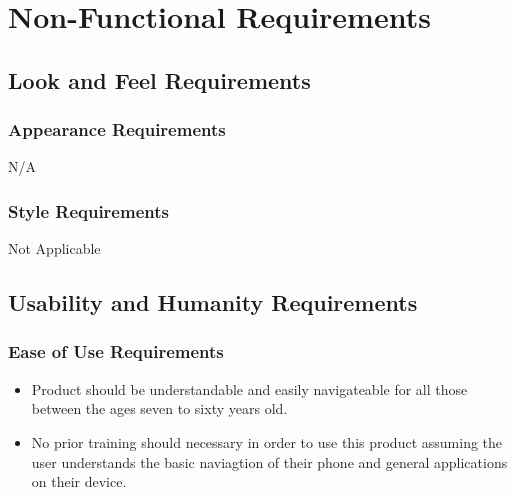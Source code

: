 \documentclass[]{article}
\begin{document}

\section{Non-Functional Requirements}
\label{sec:non-functional_requirements}
\subsection{Look and Feel Requirements}
\label{sub:look_and_feel_requirements}

\subsubsection{Appearance Requirements}
\label{ssub:appearance_requirements}
\begin{itemize}
	N/A
\end{itemize}

\subsubsection{Style Requirements}
\label{ssub:style_requirements}
	 Not Applicable


\subsection{Usability and Humanity Requirements}
\label{sub:usability_and_humanity_requirements}

\subsubsection{Ease of Use Requirements}
\label{ssub:ease_of_use_requirements}
\begin{itemize}
	\item Product should be understandable and easily navigateable for all those between the ages seven to sixty years old.
	\item No prior training should necessary in order to use this product assuming the user understands the basic naviagtion of their phone and general applications on their device.
\end{itemize}
\end{document}

